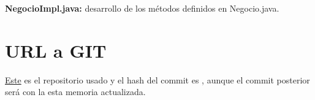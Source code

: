 \documentclass{article}
\begin{document}
\textbf{NegocioImpl.java:} desarrollo de los métodos definidos en Negocio.java.

\section{URL a GIT}

\href{https://github.com/LadyNightmare/ACOES}{Este} es el repositorio usado y el hash del commit es , aunque el commit posterior será con la esta memoria actualizada.
\end{document}
